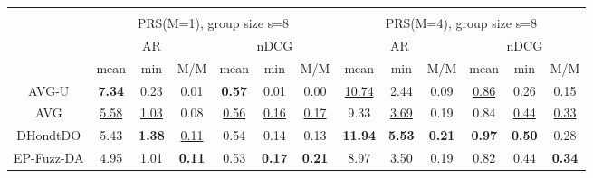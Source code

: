 \begin{tabular}{ c | c c c | c c c || c c c | c c c }
\multicolumn{12}{c}{} \\
\multicolumn{1}{c}{} & \multicolumn{6}{c}{PRS(M=1), group size s=8} & \multicolumn{6}{c}{PRS(M=4), group size s=8} \\
\multicolumn{1}{c}{} & \multicolumn{3}{c}{AR} & \multicolumn{3}{c}{nDCG} & \multicolumn{3}{c}{AR} & \multicolumn{3}{c}{nDCG} \\
& mean & min & M/M & mean & min & M/M & mean & min & M/M & mean & min & M/M \\
\hline
AVG-U & \textbf{7.34} & 0.23 & 0.01 & \textbf{0.57} & 0.01 & 0.00 & \underline{10.74} & 2.44 & 0.09 & \underline{0.86} & 0.26 & 0.15 \\
AVG & \underline{5.58} & \underline{1.03} & 0.08 & \underline{0.56} & \underline{0.16} & \underline{0.17} & 9.33 & \underline{3.69} & 0.19 & 0.84 & \underline{0.44} & \underline{0.33} \\
DHondtDO & 5.43 & \textbf{1.38} & \underline{0.11} & 0.54 & 0.14 & 0.13 & \textbf{11.94} & \textbf{5.53} & \textbf{0.21} & \textbf{0.97} & \textbf{0.50} & 0.28 \\
EP-Fuzz-DA & 4.95 & 1.01 & \textbf{0.11} & 0.53 & \textbf{0.17} & \textbf{0.21} & 8.97 & 3.50 & \underline{0.19} & 0.82 & 0.44 & \textbf{0.34} \\

\end{tabular}
